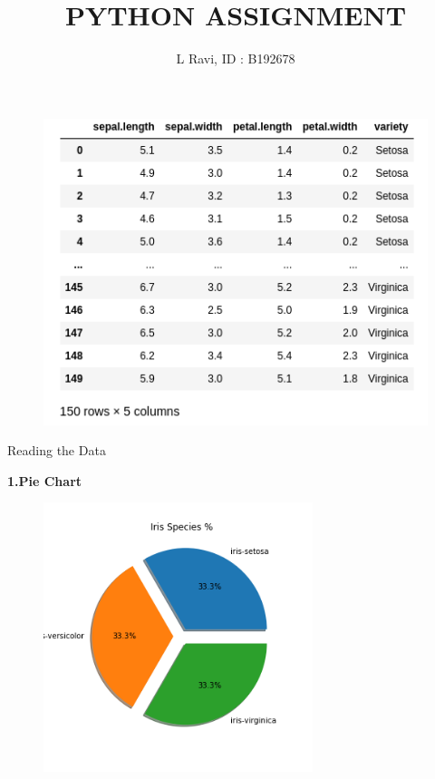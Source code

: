 \documentclass{article}
\title{\textbf{\Huge PYTHON ASSIGNMENT}}
\author{\Large{L Ravi, ID : B192678}}
\date{}
\begin{document}
\maketitle
\vspace{1cm}
\Large\color{black}{DATA: }
\begin{figure}[h]
   \centering
    \includegraphics[width=1.1\textwidth]{Data.png}
\end{figure}
\newpage
\Huge{Reading the Data}
\Huge
\vspace{1cm}

\Huge\textbf{1.Pie Chart}
\Large
\begin{figure}[h]
    \centering
    \includegraphics[width=0.7\textwidth]{1.png}
\end{figure}
\newpage
\end{document}
